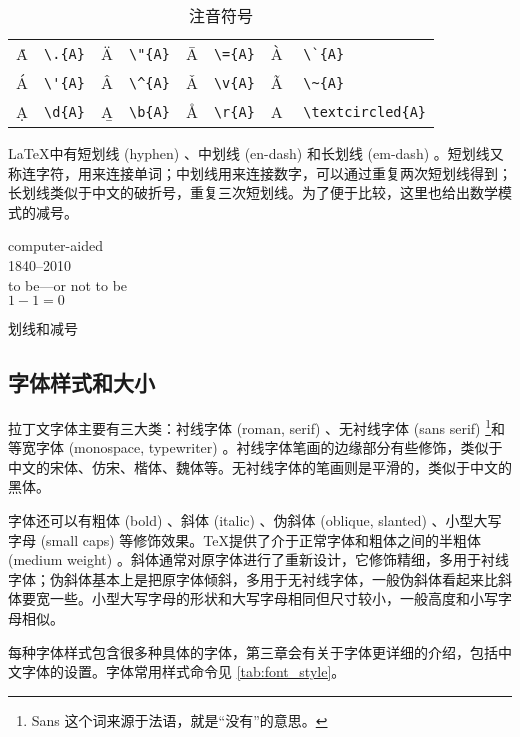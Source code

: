 \begin{table}[htbp]
\centering
\caption{注音符号}
\label{tab:accent}
\lmr
\begin{tabular}{lp{40pt}lp{40pt}lp{40pt}lp{85pt}}
  \toprule
  \.{A} & \verb|\.{A}| & \"{A} & \verb|\"{A}| & 
    \={A} & \verb|\={A}| & \`{A} & \verb|\`{A}| \\
  \'{A} & \verb|\'{A}| & \^{A} & \verb|\^{A}| & 
    \v{A} & \verb|\v{A}| & \~{A} & \verb|\~{A}| \\
  \d{A} & \verb|\d{A}| & \b{A} & \verb|\b{A}| & 
    \r{A} & \verb|\r{A}| & \textcircled{A} & \verb|\textcircled{A}| \\
  \bottomrule
\end{tabular}
\rmfamily
\end{table}

\LaTeX 中有短划线 (hyphen) 、中划线 (en-dash) 和长划线 (em-dash) 。短划线又称连字符，用来连接单词；中划线用来连接数字，可以通过重复两次短划线得到；长划线类似于中文的破折号，重复三次短划线。为了便于比较，这里也给出数学模式的减号。

\begin{example}[!h]
\begin{RLDemo}[]
computer-aided\\
1840--2010\\
to be---or not to be\\
$1-1=0$
\end{RLDemo}
\caption{划线和减号}
\label{exa:dash}
\end{example}

\subsection{字体样式和大小}
\label{sec:font_style}

拉丁文字体主要有三大类：衬线字体 (roman, serif) 、无衬线字体 (sans serif) \footnote{Sans 这个词来源于法语，就是“没有”的意思。}和等宽字体 (monospace, typewriter) 。衬线字体笔画的边缘部分有些修饰，类似于中文的宋体、仿宋、楷体、魏体等。无衬线字体的笔画则是平滑的，类似于中文的黑体。

字体还可以有粗体 (bold) 、斜体 (italic) 、伪斜体 (oblique, slanted) 、小型大写字母 (small caps) 等修饰效果。\TeX 提供了介于正常字体和粗体之间的半粗体 (medium weight) 。斜体通常对原字体进行了重新设计，它修饰精细，多用于衬线字体；伪斜体基本上是把原字体倾斜，多用于无衬线字体，一般伪斜体看起来比斜体要宽一些。小型大写字母的形状和大写字母相同但尺寸较小，一般高度和小写字母相似。

每种字体样式包含很多种具体的字体，第三章会有关于字体更详细的介绍，包括中文字体的设置。字体常用样式命令见 \autoref{tab:font_style}。

